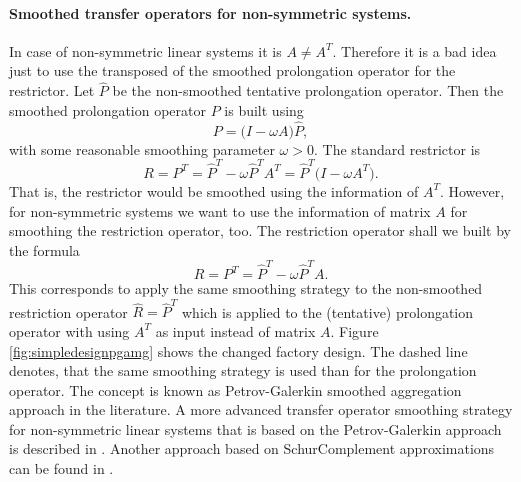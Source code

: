 \documentclass[12pt,a4paper]{article}
\begin{document}
\paragraph{Smoothed transfer operators for non-symmetric systems.}
In case of non-symmetric linear systems it is $A\neq A^T$. Therefore it is a bad idea just to use the transposed of the smoothed prolongation operator for the restrictor. Let $\widehat{P}$ be the non-smoothed tentative prolongation operator. Then the smoothed prolongation operator $P$ is built using
\begin{displaymath}
P = \bigl(I-\omega A\bigr) \widehat{P},
\end{displaymath}
with some reasonable smoothing parameter $\omega>0$.
The standard restrictor is
\begin{displaymath}
R = P^T = \widehat{P}^T - \omega \widehat{P}^T A^T = \widehat{P}^T\bigl(I-\omega A^T\bigr).
\end{displaymath}
That is, the restrictor would be smoothed using the information of $A^T$. However, for non-symmetric systems we want to use the information of matrix $A$ for smoothing the restriction operator, too. The restriction operator shall we built by the formula
\begin{displaymath}
R = P^T = \widehat{P}^T - \omega \widehat{P}^T A.
\end{displaymath}
This corresponds to apply the same smoothing strategy to the non-smoothed restriction operator $\widehat{R}=\widehat{P}^T$ which is applied to the (tentative) prolongation operator with using $A^T$ as input instead of matrix $A$. Figure \ref{fig:simpledesignpgamg} shows the changed factory design. The dashed line denotes, that the same smoothing strategy is used than for the prolongation operator. The concept is known as Petrov-Galerkin smoothed aggregation approach in the literature.
A more advanced transfer operator smoothing strategy for non-symmetric linear systems that is based on the Petrov-Galerkin approach is described in \cite{sala2008}. Another approach based on SchurComplement approximations can be found in \cite{wiesner2013}.
\end{document}
